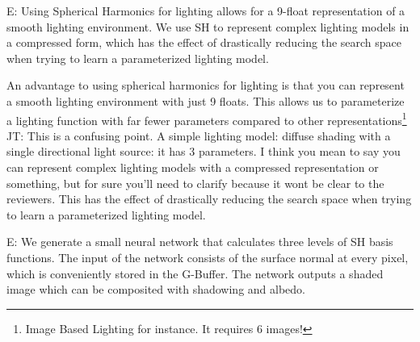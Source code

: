 \documentclass[10pt,twocolumn,letterpaper]{article}
\newcommand{\tompson}[1]{{\color{green} JT: #1}}
\newcommand{\edit}[1]{{\color{red} E: #1}}
\begin{document}
\edit{Using Spherical Harmonics for lighting allows for a 9-float representation of a smooth lighting environment. We use SH to represent complex lighting models in a compressed form, which has the effect of drastically reducing the search space when trying to learn a parameterized lighting model.}

An advantage to using spherical harmonics for lighting is that you can represent a smooth lighting environment with just 9 floats. This allows us to parameterize a lighting function with far fewer parameters compared to other representations\footnote{Image Based Lighting for instance. It requires 6 images!} \tompson{This is a confusing point. A simple lighting model: diffuse shading with a single directional light source: it has 3 parameters. I think you mean to say you can represent complex lighting models with a compressed representation or something, but for sure you'll need to clarify because it wont be clear to the reviewers}. This has the effect of drastically reducing the search space when trying to learn a parameterized lighting model.


\edit{We generate a small neural network that calculates three levels of SH basis functions. The input of the network consists of the surface normal at every pixel, which is conveniently stored in the G-Buffer. The network outputs a shaded image which can be composited with shadowing and albedo.}


\end{document}
